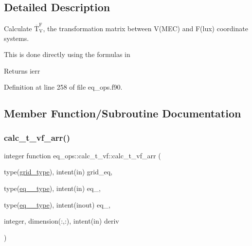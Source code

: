\subsection{Detailed Description}
Calculate $\overline{\text{T}}_\text{V}^\text{F}$, the transformation matrix between V(\+M\+E\+C) and F(lux) coordinate systems. 

This is done directly using the formula\textquotesingle{}s in \cite{Weyens3D}

\begin{DoxyReturn}{Returns}
ierr 
\end{DoxyReturn}


Definition at line 258 of file eq\+\_\+ops.\+f90.



\subsection{Member Function/\+Subroutine Documentation}
\mbox{\label{interfaceeq__ops_1_1calc__t__vf_a011486ab4c748213628917b7fb40d924}} 
\subsubsection{\texorpdfstring{calc\+\_\+t\+\_\+vf\+\_\+arr()}{calc\_t\_vf\_arr()}\hspace{0.1cm}{\footnotesize\ttfamily [1/2]}}
{\footnotesize\ttfamily integer function eq\+\_\+ops\+::calc\+\_\+t\+\_\+vf\+::calc\+\_\+t\+\_\+vf\+\_\+arr (\begin{DoxyParamCaption}\item[{type(\hyperlink{structgrid__vars_1_1grid__type}{grid\+\_\+type}), intent(in)}]{grid\+\_\+eq,  }\item[{type(\hyperlink{structeq__vars_1_1eq__1__type}{eq\+\_\+1\+\_\+type}), intent(in)}]{eq\+\_,  }\item[{type(\hyperlink{structeq__vars_1_1eq__2__type}{eq\+\_\+2\+\_\+type}), intent(inout)}]{eq\+\_,  }\item[{integer, dimension(\+:,\+:), intent(in)}]{deriv }\end{DoxyParamCaption})}



